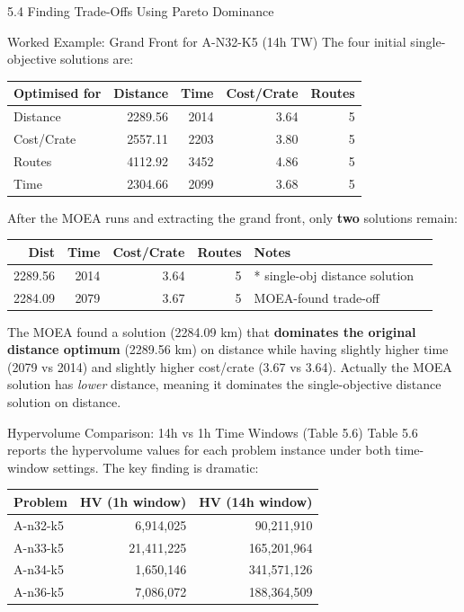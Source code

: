 \documentclass[aspectratio=169,10pt]{beamer}
\begin{document}
\begin{frame}[allowframebreaks]{5.4 Finding Trade-Offs Using Pareto Dominance}
  \begin{exampleblock}{Worked Example: Grand Front for A-N32-K5 (14h TW)}
    The four initial single-objective solutions are:
    \begin{center}
    \small
    \begin{tabular}{lrrrr}
      \toprule
      Optimised for & Distance & Time & Cost/Crate & Routes \\
      \midrule
      Distance   & 2289.56 & 2014 & 3.64 & 5 \\
      Cost/Crate & 2557.11 & 2203 & 3.80 & 5 \\
      Routes     & 4112.92 & 3452 & 4.86 & 5 \\
      Time       & 2304.66 & 2099 & 3.68 & 5 \\
      \bottomrule
    \end{tabular}
    \end{center}
    After the MOEA runs and extracting the grand front, only \textbf{two}
    solutions remain:
    \begin{center}
    \small
    \begin{tabular}{rrrrll}
      \toprule
      Dist & Time & Cost/Crate & Routes & Notes \\
      \midrule
      2289.56 & 2014 & 3.64 & 5 & * single-obj distance solution \\
      2284.09 & 2079 & 3.67 & 5 & MOEA-found trade-off \\
      \bottomrule
    \end{tabular}
    \end{center}
    The MOEA found a solution (2284.09 km) that \textbf{dominates the original
    distance optimum} (2289.56 km) on distance while having slightly higher
    time (2079 vs 2014) and slightly higher cost/crate (3.67 vs 3.64).
    Actually the MOEA solution has \emph{lower} distance, meaning it dominates
    the single-objective distance solution on distance.
  \end{exampleblock}

\framebreak

  \begin{block}{Hypervolume Comparison: 14h vs 1h Time Windows (Table 5.6)}
    Table 5.6 reports the hypervolume values for each problem instance under
    both time-window settings.  The key finding is dramatic:

    \begin{center}
    \small
    \begin{tabular}{lrr}
      \toprule
      Problem & HV (1h window) & HV (14h window) \\
      \midrule
      A-n32-k5 & 6,914,025 & 90,211,910 \\
      A-n33-k5 & 21,411,225 & 165,201,964 \\
      A-n34-k5 & 1,650,146 & 341,571,126 \\
      A-n36-k5 & 7,086,072 & 188,364,509 \\
      \bottomrule
    \end{tabular}
    \end{center}


\end{block}
\end{frame}
\end{document}
